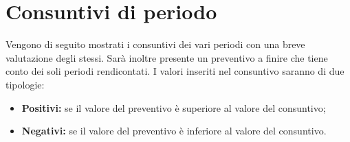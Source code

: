 \section{Consuntivi di periodo}
\label{consuntivo_preventivo_a_finire}
Vengono di seguito mostrati i consuntivi dei vari periodi con una breve valutazione degli stessi. Sarà inoltre presente un preventivo a finire che tiene conto dei soli periodi rendicontati. I valori inseriti nel consuntivo saranno di due tipologie:
\begin{itemize}
	\item \textbf{Positivi:} se il valore del preventivo è superiore al valore del consuntivo;
	\item \textbf{Negativi:} se il valore del preventivo è inferiore al valore del consuntivo.
\end{itemize}





